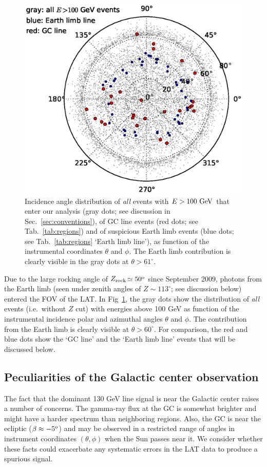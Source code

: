\documentclass[aps,twocolumn,prd,superscriptaddress,showpacs,nofootinbib,fixfloat]{revtex4}
\newcommand{\GeV}{{\rm ~GeV}}
\newcommand{\degree}{^{\rm o}}
\newcommand{\zrock}{$Z_{\rm rock}$}
\begin{document}
\begin{figure}[h]
  \begin{center}
    \includegraphics[width=0.9\linewidth]{plots/polarCounts.eps}
    \vspace{-0.5cm}
  \end{center}
  \caption{Incidence angle distribution of \emph{all} events
  with $E>100\GeV$ that enter our analysis (gray dots; see
  discussion in Sec.~\ref{sec:conventions}), of GC line
  events (red dots; see Tab.~\ref{tab:regions}) and of
  suspicious Earth limb events (blue dots; see
  Tab.~\ref{tab:regions} `Earth limb line'), as function of
  the instrumental coordinates $\theta$ and $\phi$. The
  Earth limb contribution is clearly visible in the gray
  dots at $\theta > 61^\circ$.}
  \label{fig:phiThetaDist}
\end{figure}

Due to the large rocking angle of \zrock$\simeq50\degree$
since September 2009, photons from the Earth limb (seen
under zenith angles of $Z\sim113^\circ$; see discussion
below) entered the FOV of the LAT. In
Fig~\ref{fig:phiThetaDist}, the gray dots show the
distribution of \emph{all} events (i.e.~without $Z$ cut)
with energies above 100 GeV as function of the instrumental
incidence polar and azimuthal angles $\theta$ and $\phi$.
The contribution from the Earth limb is clearly visible at
$\theta>60^\circ$. For comparison, the red and blue dots
show the `GC line' and the `Earth limb line' events that
will be discussed below.

\subsection{Peculiarities of the Galactic center observation}
The fact that the dominant 130 GeV line signal is near the
Galactic center raises a number of concerns.  The gamma-ray
flux at the GC is somewhat brighter and might have a harder
spectrum than neighboring regions. Also, the GC is near the
ecliptic ($\beta \approx -5\degree$) and may be observed in
a restricted range of angles in instrument coordinates
$(\theta, \phi)$ when the Sun passes near it.  We consider
whether these facts could exacerbate any systematic errors
in the LAT data to produce a spurious signal.
\end{document}
